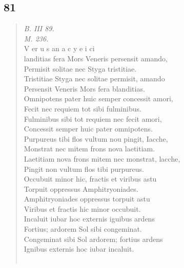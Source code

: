 \documentclass[11pt, a4paper]{report}
\begin{document}
            \subsection*{81}
      \begin{verse}
      \textit{B. III 89.} \\ \textit{M. 236.} \\ V er u s an a c y e i ci \\ landitias fera Mors Veneris persensit amando, \\ Permisit solitae nec Styga tristitiae. \\ Tristitiae Styga nec solitae permisit, amando \\ Persensit Veneris Mors fera blanditias. \\ Omnipotens pater huic semper concessit amori, \\ Fecit nec requiem tot sibi fulminibus. \\ Fulminibus sibi tot requiem nec fecit amori, \\ Concessit semper huic pater omnipotens. \\ Purpureus tibi flos vultum nou pingit, Iacche, \\ Monstrat nec mitem frons nova laetitiam. \\ Laetitiam nova frons mitem nec monstrat, lacche, \\ Pingit non vultum flos tibi purpureus. \\ Occubuit minor hic, fractis et viribus astu \\ Torpuit oppressus Amphitryoniades. \\ Amphitryoniades oppressus torpuit astu \\ Viribus et fractis hic minor occubuit. \\ Incaluit iubar hoc externis iguibus ardens \\ Fortius; ardorem Sol sibi congeminat. \\ Congeminat sibi Sol ardorem; fortius ardens \\ Ignibus externis hoc iubar incaluit. \\ 
        ﻿\pagebreak 

\end{verse}
\end{document}
